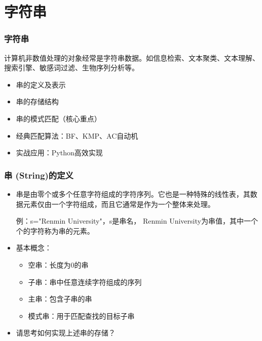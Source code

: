 \section{字符串}
\begin{frame}[fragile]
  \frametitle{字符串}
  计算机非数值处理的对象经常是字符串数据。如信息检索、文本聚类、文本理解、搜索引擎、敏感词过滤、生物序列分析等。

  \begin{itemize}
  \item 串的定义及表示
  \item 串的存储结构
  \item 串的模式匹配（核心重点）
  \item 经典匹配算法：BF、KMP、AC自动机
  \item 实战应用：Python高效实现
  \end{itemize}
\end{frame}

\begin{frame}[fragile]
  \frametitle{串 (String)的定义}

  \begin{itemize}
  \item 串是由零个或多个任意字符组成的字符序列。它也是一种特殊的线性表，其数据元素仅由一个字符组成，而且它通常是作为一个整体来处理。

  例：s="Renmin University"，s是串名， Renmin University为串值，其中一个个的字符称为串的元素。

  \item 基本概念：
    \begin{itemize}
    \item 空串：长度为0的串
    \item 子串：串中任意连续字符组成的序列
    \item 主串：包含子串的串
    \item 模式串：用于匹配查找的目标子串
    \end{itemize}

  \item 请思考如何实现上述串的存储？
  \end{itemize}
\end{frame}

